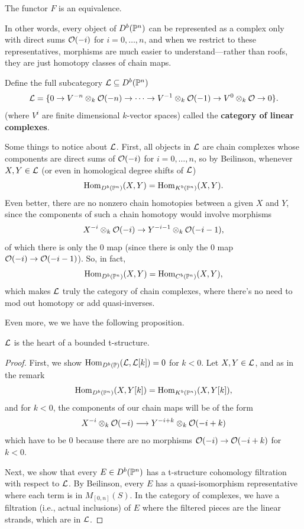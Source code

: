 \documentclass[12pt]{article}
\begin{document}
\begin{thm}
    The functor $F$ is an equivalence.
\end{thm}

In other words, every object of $D^b(\P^n)$ can be represented as a complex only with direct sums $\cO(-i)$ for $i=0,\dots,n$, and when we restrict to these representatives, morphisms are much easier to understand---rather than roofs, they are just homotopy classes of chain maps.

\begin{defn}
    Define the full subcategory $\cL \subseteq D^b(\P^n)$
    \[\cL = \{0\to V^{-n}\otimes_k \cO(-n) \to \cdots \to V^{-1}\otimes_k \cO(-1) \to V^0 \otimes_k \cO \to 0 \}.\]
    (where $V^i$ are finite dimensional $k$-vector spaces) called the \textbf{category of linear complexes}.
\end{defn}

Some things to notice about $\cL$. First, all objects in $\cL$ are chain complexes whose components are direct sums of $\cO(-i)$ for $i=0,\dots,n$, so by Beilinson, whenever $X,Y\in \cL$ (or even in homological degree shifts of $\cL$)
\[\Hom_{D^b(\P^n)}(X,Y) = \Hom_{K^b(\P^n)}(X,Y).\]
Even better, there are no nonzero chain homotopies between a given $X$ and $Y$, since the components of such a chain homotopy would involve morphisms
\[X^{-i}\otimes_k \cO(-i) \to Y^{-i-1}\otimes_k \cO(-i-1),\]
of which there is only the 0 map (since there is only the 0 map $\cO(-i)\to \cO(-i-1)$). So, in fact,
\[\Hom_{D^b(\P^n)}(X,Y) = \Hom_{C^b(\P^n)}(X,Y),\]
which makes $\cL$ truly the category of chain complexes, where there's no need to mod out homotopy or add quasi-inverses.

Even more, we we have the following proposition.

\begin{prop}
    $\cL$ is the heart of a bounded t-structure.
\end{prop}
\begin{proof}
    First, we show $\Hom_{D^b(\P)}(\cL,\cL[k])=0$ for $k<0$. Let $X,Y\in \cL$, and as in the remark
    \[\Hom_{D^b(\P^n)}(X,Y[k]) = \Hom_{K^b(\P^n)}(X,Y[k]),\]
    and for $k<0$, the components of our chain maps will be of the form
    \[X^{-i}\otimes_k \cO(-i) \longrightarrow Y^{-i+k} \otimes_k \cO(-i+k)\]
    which have to be 0 because there are no morphisms $\cO(-i)\to \cO(-i+k)$ for $k<0$.

    Next, we show that every $E \in D^b(\P^n)$ has a t-structure cohomology filtration with respect to $\cL$. By Beilinson, every $E$ has a quasi-isomorphism representative where each term is in $M_{[0,n]}(S)$. In the category of complexes, we have a filtration (i.e., actual inclusions) of $E$ where the filtered pieces are the linear strands, which are in $\cL$.
\end{proof}
\end{document}
